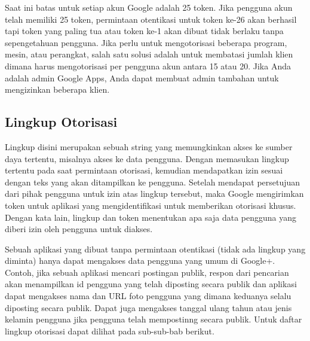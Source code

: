 Saat ini batas untuk setiap akun Google adalah 25 token. Jika pengguna akun telah memiliki 25 token, permintaan otentikasi untuk token ke-26 akan berhasil tapi token yang paling tua atau token ke-1 akan dibuat tidak berlaku tanpa sepengetahuan pengguna.
Jika perlu untuk mengotorisasi beberapa program, mesin, atau perangkat, salah satu solusi adalah untuk membatasi jumlah klien dimana harus mengotorisasi per pengguna akun antara 15 atau 20. Jika Anda adalah admin Google Apps, Anda dapat membuat admin tambahan untuk mengizinkan beberapa klien.

\subsection{Lingkup Otorisasi}
Lingkup disini merupakan sebuah string yang memungkinkan akses ke sumber daya tertentu, misalnya akses ke data pengguna. Dengan memasukan lingkup tertentu pada saat permintaan otorisasi, kemudian mendapatkan izin sesuai dengan teks yang akan ditampilkan ke pengguna. Setelah mendapat persetujuan dari pihak pengguna untuk izin atas lingkup tersebut, maka Google mengirimkan token untuk aplikasi yang mengidentifikasi untuk memberikan otorisasi khusus. Dengan kata lain, lingkup dan token menentukan apa saja data pengguna yang diberi izin oleh pengguna untuk diakses.

Sebuah aplikasi yang dibuat tanpa permintaan otentikasi (tidak ada lingkup yang diminta) hanya dapat mengakses data pengguna yang umum di Google+. Contoh, jika sebuah aplikasi mencari postingan publik, respon dari pencarian akan menampilkan id pengguna yang telah diposting secara publik dan aplikasi dapat mengakses nama dan URL foto pengguna yang dimana keduanya selalu diposting secara publik. Dapat juga mengakses tanggal ulang tahun atau jenis kelamin pengguna jika pengguna telah mempostinng secara publik. Untuk daftar lingkup otorisasi dapat dilihat pada sub-sub-bab berikut.

